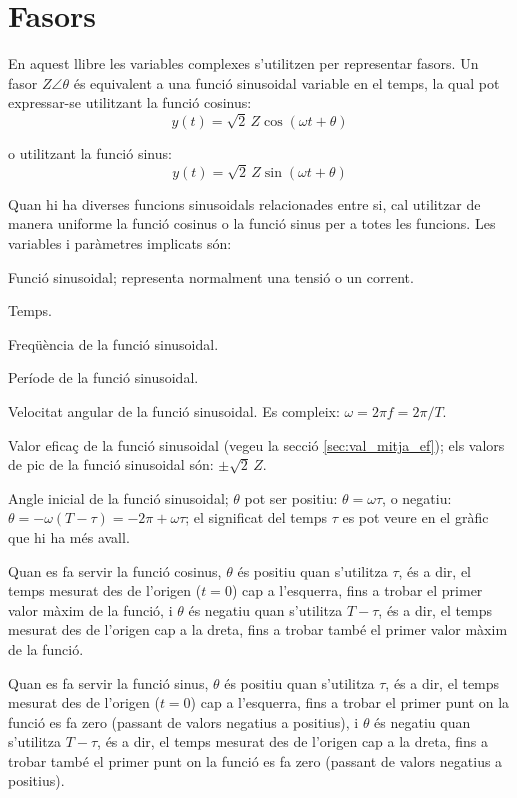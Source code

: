 \section*{Fasors}  \label{sec:fasors}

En aquest llibre les variables complexes s'utilitzen per representar fasors. Un fasor $Z\angle\theta$ és equivalent a una funció sinusoidal variable en el temps, la qual pot expressar-se utilitzant la funció cosinus:
\[y(t)=\sqrt{2}\, Z \cos(\omega t + \theta)\]

o utilitzant la funció sinus:
\[y(t)=\sqrt{2}\, Z \sin(\omega t + \theta)\]

Quan hi ha diverses funcions sinusoidals relacionades entre si, cal utilitzar de manera uniforme la funció cosinus o la funció sinus per a totes les funcions. Les variables i paràmetres implicats són:
\begin{list}{}
{\setlength{\labelwidth}{15mm} \setlength{\leftmargin}{20mm}
\setlength{\labelsep}{5mm}}
    \item[$y(t)$] Funció sinusoidal; representa normalment una tensió o un corrent.
    \item[$t$] Temps.
    \item[$f$] Freqüència de la funció sinusoidal.
    \item[$T$] Període de la funció sinusoidal.
    \item[$\omega$] Velocitat angular de la funció sinusoidal. Es compleix: $\omega = 2 \pi f = 2 \pi/T$.
    \item[$Z$] Valor eficaç de la funció sinusoidal (vegeu la secció \vref{sec:val_mitja_ef}); els valors de pic de la funció sinusoidal  són:  $\pm\sqrt{2}\, Z$.
    \item[$\theta$] Angle inicial de la funció sinusoidal;  $\theta$ pot ser positiu: $\theta=\omega \tau$, o negatiu: $\theta = -\omega (T-\tau) = -2\pi + \omega \tau$; el significat del temps $\tau$  es pot veure en el gràfic que hi ha més avall.

    Quan es fa servir la funció cosinus, $\theta$ és positiu quan s'utilitza $\tau$, és a dir, el temps mesurat  des de l'origen ($t=0$) cap a l'esquerra, fins a trobar el primer valor màxim de la funció, i $\theta$ és negatiu quan s'utilitza $T-\tau$, és a dir, el temps mesurat des de l'origen cap a la dreta, fins a trobar també el primer valor màxim de la funció.

    Quan es fa servir la funció sinus, $\theta$ és positiu quan s'utilitza $\tau$, és a dir, el temps mesurat des de l'origen ($t=0$) cap a l'esquerra, fins a trobar el primer punt on la funció es fa zero (passant de valors negatius a positius), i $\theta$ és negatiu quan s'utilitza $T-\tau$, és a dir, el temps mesurat des de l'origen cap a la dreta, fins a trobar també el primer punt on la funció es fa zero (passant de valors negatius a positius).
    \item[] 
\end{list}

